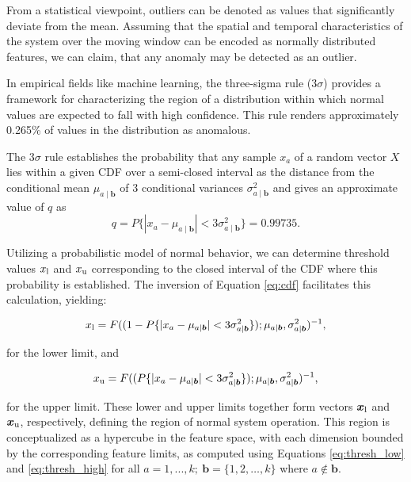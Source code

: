 From a statistical viewpoint, outliers can be denoted as values that significantly deviate from the mean. Assuming that the spatial and temporal characteristics of the system over the moving window can be encoded as normally distributed features, we can claim, that any anomaly may be detected as an outlier.

In empirical fields like machine learning, the three-sigma rule ($3\sigma$) provides a framework for characterizing the region of a distribution within which normal values are expected to fall with high confidence. This rule renders approximately 0.265\% of values in the distribution as anomalous.

The \(3\sigma\) rule establishes the probability that any sample \(x_a\) of a random vector \({X}\) lies within a given CDF over a semi-closed interval as the distance from the conditional mean \(\mu_{a \mid \boldsymbol{b}} \) of 3 conditional variances \(\sigma_{a \mid \boldsymbol{b}}^2\) and gives an approximate value of $q$ as
\begin{equation}
q=P\{|x_a-\mu_{a \mid \boldsymbol{b}} |<3\sigma_{a \mid \boldsymbol{b}}^2\}=0.99735
\text{.}\label{eq:q}
\end{equation}

Utilizing a probabilistic model of normal behavior, we can determine threshold values ${x _{\text{l}}}$ and ${x _{\text{u}}}$ corresponding to the closed interval of the CDF where this probability is established. The inversion of Equation \eqref{eq:cdf} facilitates this calculation, yielding:

\begin{equation}
{x _{\text{l}}} = F((1 - P\{|x_a-\mu_{a \mid \boldsymbol{b}}|<3\sigma_{a \mid \boldsymbol{b}}^2\}); \mu_{a \mid \boldsymbol{b}}, \sigma_{a \mid \boldsymbol{b}}^2)^{-1}\text{,}\label{eq:thresh_low}
\end{equation}

for the lower limit, and

\begin{equation}
{x _{\text{u}}} = F((P\{|x_a-\mu_{a \mid \boldsymbol{b}}|<3\sigma_{a \mid \boldsymbol{b}}^2\}); \mu_{a \mid \boldsymbol{b}}, \sigma_{a \mid \boldsymbol{b}}^2)^{-1}\text{,}\label{eq:thresh_high}
\end{equation}

for the upper limit. These lower and upper limits together form vectors $\boldsymbol{x _{\text{l}}}$ and $\boldsymbol{x _{\text{u}}}$, respectively, defining the region of normal system operation. This region is conceptualized as a hypercube in the feature space, with each dimension bounded by the corresponding feature limits, as computed using Equations \eqref{eq:thresh_low} and \eqref{eq:thresh_high} for all $a = 1,...,k;~ \boldsymbol{b} = \{1, 2, \ldots, k\}$ where $a \notin \boldsymbol{b}$.

